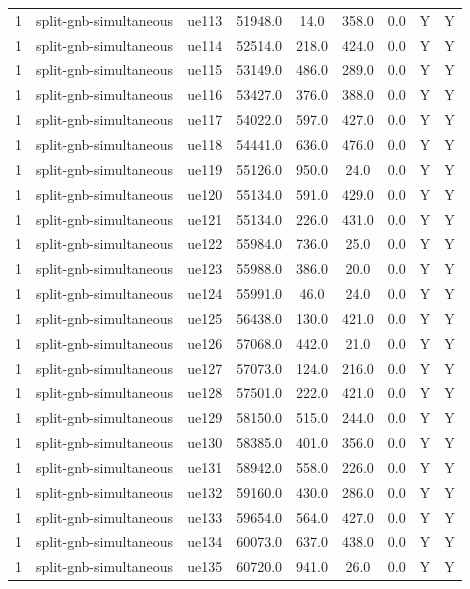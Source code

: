 \begin{table}[ht]
\begin{tabular}{|c|c|c|c|c|c|c|c|c|}
1 & split-gnb-simultaneous & ue113 & 51948.0 & 14.0 & 358.0 & 0.0 & Y & Y \\
1 & split-gnb-simultaneous & ue114 & 52514.0 & 218.0 & 424.0 & 0.0 & Y & Y \\
1 & split-gnb-simultaneous & ue115 & 53149.0 & 486.0 & 289.0 & 0.0 & Y & Y \\
1 & split-gnb-simultaneous & ue116 & 53427.0 & 376.0 & 388.0 & 0.0 & Y & Y \\
1 & split-gnb-simultaneous & ue117 & 54022.0 & 597.0 & 427.0 & 0.0 & Y & Y \\
1 & split-gnb-simultaneous & ue118 & 54441.0 & 636.0 & 476.0 & 0.0 & Y & Y \\
1 & split-gnb-simultaneous & ue119 & 55126.0 & 950.0 & 24.0 & 0.0 & Y & Y \\
1 & split-gnb-simultaneous & ue120 & 55134.0 & 591.0 & 429.0 & 0.0 & Y & Y \\
1 & split-gnb-simultaneous & ue121 & 55134.0 & 226.0 & 431.0 & 0.0 & Y & Y \\
1 & split-gnb-simultaneous & ue122 & 55984.0 & 736.0 & 25.0 & 0.0 & Y & Y \\
1 & split-gnb-simultaneous & ue123 & 55988.0 & 386.0 & 20.0 & 0.0 & Y & Y \\
1 & split-gnb-simultaneous & ue124 & 55991.0 & 46.0 & 24.0 & 0.0 & Y & Y \\
1 & split-gnb-simultaneous & ue125 & 56438.0 & 130.0 & 421.0 & 0.0 & Y & Y \\
1 & split-gnb-simultaneous & ue126 & 57068.0 & 442.0 & 21.0 & 0.0 & Y & Y \\
1 & split-gnb-simultaneous & ue127 & 57073.0 & 124.0 & 216.0 & 0.0 & Y & Y \\
1 & split-gnb-simultaneous & ue128 & 57501.0 & 222.0 & 421.0 & 0.0 & Y & Y \\
1 & split-gnb-simultaneous & ue129 & 58150.0 & 515.0 & 244.0 & 0.0 & Y & Y \\
1 & split-gnb-simultaneous & ue130 & 58385.0 & 401.0 & 356.0 & 0.0 & Y & Y \\
1 & split-gnb-simultaneous & ue131 & 58942.0 & 558.0 & 226.0 & 0.0 & Y & Y \\
1 & split-gnb-simultaneous & ue132 & 59160.0 & 430.0 & 286.0 & 0.0 & Y & Y \\
1 & split-gnb-simultaneous & ue133 & 59654.0 & 564.0 & 427.0 & 0.0 & Y & Y \\
1 & split-gnb-simultaneous & ue134 & 60073.0 & 637.0 & 438.0 & 0.0 & Y & Y \\
1 & split-gnb-simultaneous & ue135 & 60720.0 & 941.0 & 26.0 & 0.0 & Y & Y \\

\end{tabular}
\end{table}
